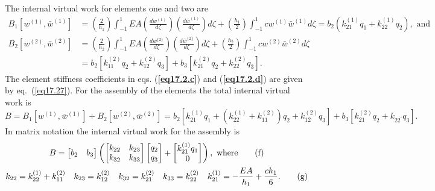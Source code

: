 \documentclass{AeroStructure-ERJohnson}
\begin{document}
\begin{example}
The internal virtual work for elements one and two are
\begin{align}
B_{1}\left[w^{(1)}, \bar{w}^{(1)}\right] &=\left(\frac{2}{h_{1}}\right) \int_{-1}^{1} E A\left(\frac{d w^{(1)}}{d \zeta}\right)\left(\frac{d \bar{w}^{(1)}}{d \zeta}\right) d \zeta+\left(\frac{h_{1}}{2}\right) \int_{-1}^{1} c w^{(1)} \bar{w}^{(1)} d \zeta=b_{2}\left(k_{21}^{(1)} q_{1}+k_{22}^{(1)} q_{2}\right), \textrm{ and}\label{eq17.2.c}\tag{c}\\
B_{2}\left[w^{(2)}, \bar{w}^{(2)}\right] &=\left(\frac{2}{h_{2}}\right) \int_{-1}^{1} E A\left(\frac{d w^{\{2\}}}{d \zeta}\right)\left(\frac{d \bar{w}^{\{2\}}}{d \zeta}\right) d \zeta+\left(\frac{h_{2}}{2}\right) \int_{-1}^{1} c w^{(2)} \bar{w}^{(2)} d \zeta\nonumber\\
& =b_{2}\left[k_{11}^{(2)} q_{2}+k_{12}^{(2)} q_{3}\right]+b_{3}\left[k_{21}^{(2)} q_{2}+k_{22}^{(2)} q_{3}\right]. \label{eq17.2.d}\tag{d}
\end{align}
The element stiffness coefficients in eqs. (\textbf{\ref{eq17.2.c}}) and (\textbf{\ref{eq17.2.d}}) are given by eq.~(\ref{eq17.27}). For the assembly of the elements the total internal virtual work is
\begin{equation}
B=B_{1}\left[w^{(1)}, \bar{w}^{(1)}\right]+B_{2}\left[w^{(2)}, \bar{w}^{(2)}\right]=b_{2}\left[k_{21}^{(1)} q_{1}+\left(k_{22}^{(1)}+k_{11}^{(2)}\right) q_{2}+k_{12}^{(2)} q_{3}\right]+b_{3}\left[k_{21}^{(2)} q_{2}+k_{22^{\prime}} q_{3}\right]. \label{eq17.2.e}\tag{e}
\end{equation}
In matrix notation the internal virtual work for the assembly is
\begin{gather}
B=\left[\begin{array}{@{}ll@{}}b_{2} & b_{3}\end{array}\right]\left(\left[\begin{array}{@{}ll@{}}k_{22} & k_{23} \\k_{32} & k_{33}\end{array}\right]\left[\begin{array}{@{}l@{}}q_{2} \\q_{3}\end{array}\right]+\left[\begin{array}{@{}c@{}}k_{21}^{(1)} q_{1} \\0\end{array}\right]\right), \textrm{ where}\label{eq17.2.f}\tag{f}\\
k_{22}=k_{22}^{(1)}+k_{11}^{(2)} \quad k_{23}=k_{12}^{(2)} \quad k_{32}=k_{21}^{(2)} \quad k_{33}=k_{22}^{(2)} \quad k_{21}^{(1)}=-\frac{E A}{h_{1}}+\frac{c h_{1}}{6}. \label{eq17.2.g}\tag{g}

\end{gather}
\end{example}
\end{document}
